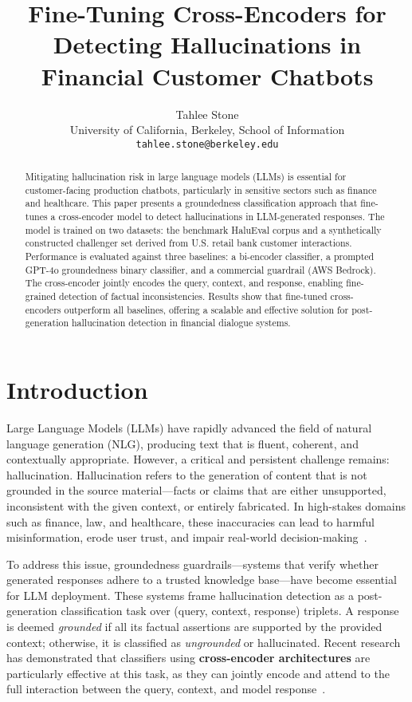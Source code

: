 \documentclass[11pt]{article}
\title{Fine-Tuning Cross-Encoders for Detecting Hallucinations in Financial Customer Chatbots}
\author{
  Tahlee Stone \\
  University of California, Berkeley, School of Information \\
  \texttt{tahlee.stone@berkeley.edu}
}
\begin{document}
\maketitle

\begin{abstract}
Mitigating hallucination risk in large language models (LLMs) is essential for customer-facing production chatbots, particularly in sensitive sectors such as finance and healthcare. This paper presents a groundedness classification approach that fine-tunes a cross-encoder model to detect hallucinations in LLM-generated responses. The model is trained on two datasets: the benchmark HaluEval corpus and a synthetically constructed challenger set derived from U.S. retail bank customer interactions. Performance is evaluated against three baselines: a bi-encoder classifier, a prompted GPT-4o groundedness binary classifier, and a commercial guardrail (AWS Bedrock). The cross-encoder jointly encodes the query, context, and response, enabling fine-grained detection of factual inconsistencies. Results show that fine-tuned cross-encoders outperform all baselines, offering a scalable and effective solution for post-generation hallucination detection in financial dialogue systems.
\end{abstract}


\section{Introduction}

Large Language Models (LLMs) have rapidly advanced the field of natural language generation (NLG), producing text that is fluent, coherent, and contextually appropriate. However, a critical and persistent challenge remains: hallucination. Hallucination refers to the generation of content that is not grounded in the source material—facts or claims that are either unsupported, inconsistent with the given context, or entirely fabricated. In high-stakes domains such as finance, law, and healthcare, these inaccuracies can lead to harmful misinformation, erode user trust, and impair real-world decision-making~\cite{maynez2020faithfulness, kryscinski2019factcc}.

To address this issue, groundedness guardrails—systems that verify whether generated responses adhere to a trusted knowledge base—have become essential for LLM deployment. These systems frame hallucination detection as a post-generation classification task over (query, context, response) triplets. A response is deemed \textit{grounded} if all its factual assertions are supported by the provided context; otherwise, it is classified as \textit{ungrounded} or hallucinated. Recent research has demonstrated that classifiers using \textbf{cross-encoder architectures} are particularly effective at this task, as they can jointly encode and attend to the full interaction between the query, context, and model response~\cite{falke2019ranking, kryscinski2019factcc}.
\end{document}
